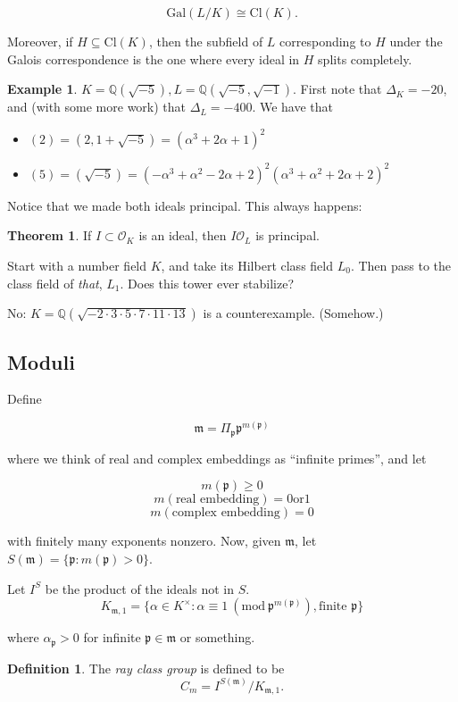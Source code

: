 \documentclass{article}
\newcommand{\Mod}[1]{\ (\text{mod}\ #1)}
\newcommand{\Q}{\mathbb Q}
\newcommand{\gal}[2]{\text{Gal}(#1/#2)}
\newcommand{\pp}{\mathfrak p}
\newcommand{\mm}{\mathfrak m}
\newcommand{\ok}{\mathcal O_K}
\newcommand{\ol}{\mathcal O_L}
\newcommand{\Cl}[1]{\text{Cl}(#1)}
\newcommand{\clk}{\Cl K}
\theoremstyle{definition}
\newtheorem*{thm}{Theorem}
\newtheorem*{defn}{Definition}
\newtheorem*{example}{Example}
\begin{document}
$$\gal L K \cong \clk.$$

Moreover, if $H \subseteq \clk$, then the subfield of $L$ corresponding to $H$
under the Galois correspondence is the one where every ideal in $H$ splits completely.

\begin{example}$K=\Q(\sqrt{-5}), L=\Q(\sqrt{-5},\sqrt{-1})$.
  First note that $\Delta_K = -20$, and (with some more work) that $\Delta_L = -400$.
  We have that
  \begin{itemize}
  \item $(2) = (2,1+\sqrt{-5}) = {(\alpha^3+2\alpha+1)}^2$
  \item $(5) = (\sqrt{-5}) = {(-\alpha^3+\alpha^2-2\alpha+2)}^2{(\alpha^3+\alpha^2+2\alpha+2)}^2$
  \end{itemize}

  Notice that we made both ideals principal. This always happens:
  \begin{thm}
    If $I\subset\ok$ is an ideal, then $I\ol$ is principal.
  \end{thm}
\end{example}

Start with a number field $K$, and take its Hilbert class field $L_0$. Then pass to
the class field of \textit{that}, $L_1$. Does this tower ever stabilize?

No: $K = \Q(\sqrt{-2\cdot 3\cdot5\cdot7\cdot11\cdot13})$ is a counterexample. (Somehow.)

\subsection{Moduli}
Define

$$\mathfrak m = \Pi_{\pp} {\pp}^{m(\pp)}$$

where we think of real and complex embeddings as ``infinite primes'', and let

$$m(\pp) \geq 0$$
$$m(\text{real embedding}) = 0\text{or}1$$
$$m(\text{complex embedding}) = 0$$

with finitely many exponents nonzero. Now, given $\mm$, let $S(\mm) = \{\pp:
m(\pp) > 0\}$.

Let $I^S$ be the product of the ideals not in $S$.
$$K_{\mm,1} = \{\alpha\in K^\times : \alpha\equiv 1 \Mod{\pp^{m(\pp)}},
\text{finite } \pp\}$$

where $\alpha_\pp > 0$ for infinite $\pp\in\mm$ or something.

\begin{defn}
  The \textit{ray class group} is defined to be
  $$C_m = I^{S(\mm)}/K_{\mm,1}.$$
\end{defn}
\end{document}
